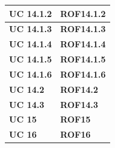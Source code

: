 \begin{longtable}{ |p{3cm}|p{3cm}|  }
    \textbf{UC 14.1.2}  & \textbf{ROF14.1.2}   \\ \hline
    \textbf{UC 14.1.3}  & \textbf{ROF14.1.3}   \\ \hline
    \textbf{UC 14.1.4}  & \textbf{ROF14.1.4}   \\ \hline
    \textbf{UC 14.1.5}  & \textbf{ROF14.1.5}   \\ \hline
    \textbf{UC 14.1.6}  & \textbf{ROF14.1.6}   \\ \hline
    \textbf{UC 14.2}    & \textbf{ROF14.2}     \\ \hline
    \textbf{UC 14.3}    & \textbf{ROF14.3}     \\ \hline
    \textbf{UC 15}      & \textbf{ROF15}       \\ \hline
    \textbf{UC 16}      & \textbf{ROF16}       \\ \hline
\end{longtable}

